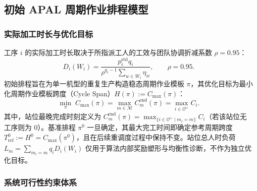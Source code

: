\documentclass[journal,10pt]{IEEEtran}
\begin{document}
\subsection{初始 APAL 周期作业排程模型}\label{sec:init_model}

\subsubsection{实际加工时长与优化目标}

工序 $i$ 的实际加工时长取决于所指派工人的工效与团队协调折减系数 $\rho=0.95$：
\begin{equation}\label{eq:duration}
D_i(W_i) = \frac{p_i^{\mathrm{std}} q_i}{\rho^{q_i-1} \sum_{w\in W_i} \eta_w}, \qquad \rho = 0.95.
\end{equation}
初始排程旨在为单一机型的重复生产构造稳态周期作业模板 $\pi$，其优化目标为最小化周期作业模板跨度（Cycle Span）$H(\pi) := C_{\max}(\pi)$：
\begin{equation}\label{eq:cmax}
\min_{\pi}\; C_{\max}(\pi) = \max_{m\in\mathcal{M}} C_m^{\mathrm{end}}(\pi) = \max_{i\in\mathcal{O}^{+}} C_i.
\end{equation}
其中，站位最晚完成时刻定义为 $C_m^{\mathrm{end}}(\pi) = \max_{\{i\in\mathcal{O}^{+} \mid m_i=m\}} C_i$（若该站位无工序则为 0）。基准排程 $\pi^0$ 一旦确定，其最大完工时间即确定参考周期跨度 $T_{\mathrm{ref}}^0:=H^0=C_{\max}(\pi^0)$，且在后续重调度过程中保持不变。站位总人时负荷 $L_m = \sum_{m_i=m} q_i D_i(W_i)$ 仅用于算法内部奖励塑形与均衡性诊断，不作为独立优化目标。

\subsubsection{系统可行性约束体系}
\end{document}

